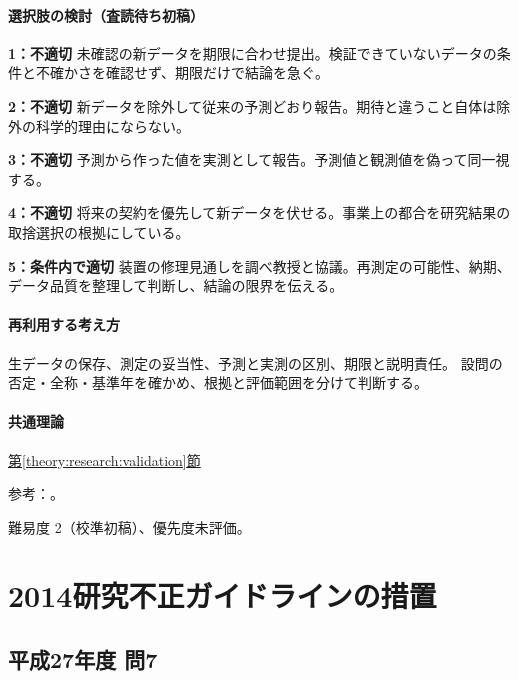 \paragraph{選択肢の検討（査読待ち初稿）}\mbox{}\par

\noindent\textbf{1：不適切} 未確認の新データを期限に合わせ提出。検証できていないデータの条件と不確かさを確認せず、期限だけで結論を急ぐ。\par

\noindent\textbf{2：不適切} 新データを除外して従来の予測どおり報告。期待と違うこと自体は除外の科学的理由にならない。\par

\noindent\textbf{3：不適切} 予測から作った値を実測として報告。予測値と観測値を偽って同一視する。\par

\noindent\textbf{4：不適切} 将来の契約を優先して新データを伏せる。事業上の都合を研究結果の取捨選択の根拠にしている。\par

\noindent\textbf{5：条件内で適切} 装置の修理見通しを調べ教授と協議。再測定の可能性、納期、データ品質を整理して判断し、結論の限界を伝える。\par

\paragraph{再利用する考え方} 生データの保存、測定の妥当性、予測と実測の区別、期限と説明責任。 設問の否定・全称・基準年を確かめ、根拠と評価範囲を分けて判断する。

\paragraph{共通理論} \hyperref[theory:research:validation]{第\ref*{theory:research:validation}節}

\par 参考：\cite{scj_code2013,mext_misconduct2014}。

\par 難易度 2（校準初稿）、優先度未評価。

\section{2014研究不正ガイドラインの措置}

\subsection{平成27年度 問7}
\label{q:h27-reg-apt-07}

